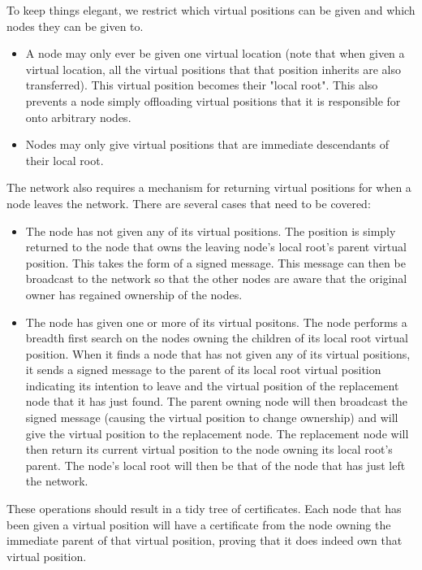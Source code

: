\documentclass[ %
                    author={Luke Murray},
                supervisor={Dr. Simon Hollis},
                     title={Shadow Peer-to-Peer Networks},
                  subtitle={},
                    degree={MEng},
                      year={2013} ]{thesis}
\begin{document}
To keep things elegant, we restrict which virtual positions can be given and which nodes they can be given to.
\begin{itemize}
\item A node may only ever be given one virtual location (note that when given a virtual location, all the virtual positions that that position inherits are also transferred). This virtual position becomes their "local root". This also prevents a node simply offloading virtual positions that it is responsible for onto arbitrary nodes.
\item Nodes may only give virtual positions that are immediate descendants of their local root.
\end{itemize}

The network also requires a mechanism for returning virtual positions for when a node leaves the network. There are several cases that need to be covered:
\begin{itemize}
\item The node has not given any of its virtual positions. The position is simply returned to the node that owns the leaving node's local root's parent virtual position. This takes the form of a signed message. This message can then be broadcast to the network so that the other nodes are aware that the original owner has regained ownership of the nodes.
\item The node has given one or more of its virtual positons. The node performs a breadth first search on the nodes owning the children of its local root virtual position. When it finds a node that has not given any of its virtual positions, it sends a signed message to the parent of its local root virtual position indicating its intention to leave and the virtual position of the replacement node that it has just found. The parent owning node will then broadcast the signed message (causing the virtual position to change ownership) and will give the virtual position to the replacement node. The replacement node will then return its current virtual position to the node owning its local root's parent. The node's local root will then be that of the node that has just left the network.
\end{itemize}

These operations should result in a tidy tree of certificates. Each node that has been given a virtual position will have a certificate from the node owning the immediate parent of that virtual position, proving that it does indeed own that virtual position.
\end{document}
